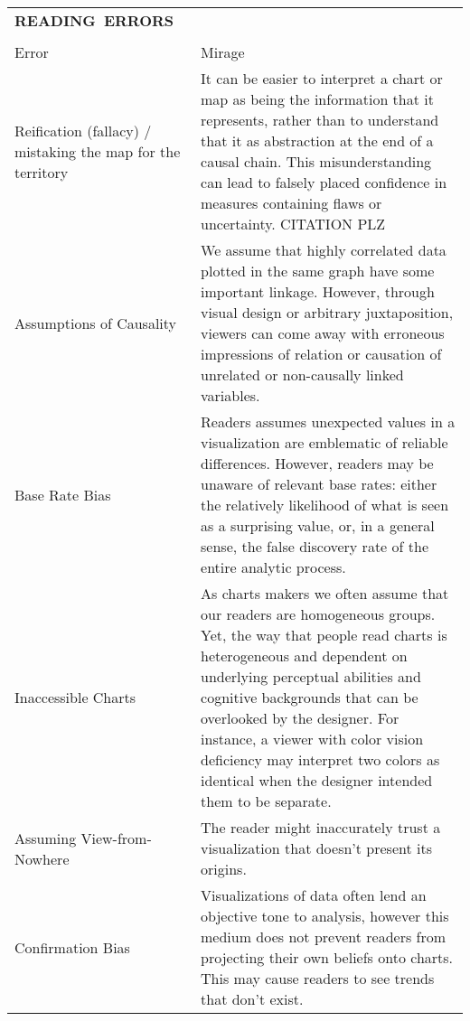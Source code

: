 \begin{longtable}{p{3cm}p{14cm}}
  \\\hbox{\normalsize{\textbf{READING ERRORS}}}&\\ \\
  \normalsize{Error} & \normalsize{Mirage}\\ \hline
   \rowcolor{colord}Reification (fallacy) / mistaking the map for the territory  & It can be easier to interpret a chart or map as being the information that it represents, rather than to understand that it as abstraction at the end of a causal chain. This misunderstanding can lead to falsely placed confidence in measures containing flaws or uncertainty.  CITATION PLZ\\
 \rowcolor{colord-opaque}Assumptions of Causality & We assume that highly correlated data plotted in the same graph have some important linkage. However, through visual design or arbitrary juxtaposition, viewers can come away with erroneous impressions of relation or causation of unrelated or non-causally linked variables. \cite{xiong2019illusion, few2019loom}\\
 \rowcolor{colord}Base Rate Bias & Readers assumes unexpected values in a visualization are emblematic of reliable differences. However, readers may be unaware of relevant base rates: either the relatively likelihood of what is seen as a surprising value, or, in a general sense, the false discovery rate of the entire analytic process.  \cite{correll2016surprise,pu2018garden, zgraggen2018investigating}\\
 \rowcolor{colord-opaque}Inaccessible Charts & As charts makers we often assume that our readers are homogeneous groups. Yet, the way that people read charts is heterogeneous and dependent on underlying perceptual abilities and cognitive backgrounds that can be overlooked by the designer. For instance, a viewer with color vision deficiency may interpret two colors as identical when the designer intended them to be separate. \cite{lundgard2019Sociotechnical, plaisant2005information}\\
 \rowcolor{colord}Assuming View-from-Nowhere & The reader might inaccurately trust a visualization that doesn't present its origins. \cite{dignazio2019draft, d2016feminist}\\
 \rowcolor{colord-opaque}Confirmation Bias & Visualizations of data often lend an objective tone to analysis, however this medium does not prevent readers from projecting their own beliefs onto charts. This may cause readers to see trends that don't exist. \cite{valdez2017framework, few2019loom}\\

\end{longtable}

